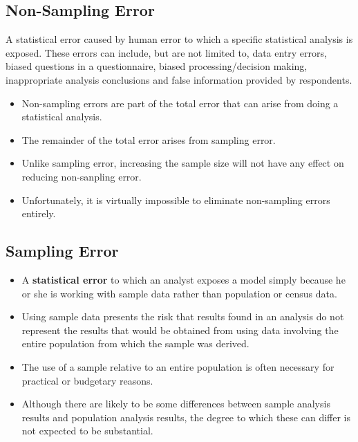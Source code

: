 ﻿\documentclass[]{report}
\begin{document}
\subsection{Non-Sampling Error}

A statistical error caused by human error to which a specific statistical analysis is exposed. These errors can include, but are not limited to, data entry errors, biased questions in a questionnaire, biased processing/decision making, inappropriate analysis conclusions and false information provided by respondents.




\begin{itemize}
\item 
Non-sampling errors are part of the total error that can arise from doing a statistical analysis. 
\item The remainder of the total error arises from sampling error. 
\item Unlike sampling error, increasing the sample size will not have any effect on reducing non-sanpling error.
\item Unfortunately, it is virtually impossible to eliminate non-sampling errors entirely. 
\end{itemize}



\subsection{Sampling Error}

\begin{itemize}
\item A \textbf{statistical error} to which an analyst exposes a model simply because he or she is working with sample data rather than population or census data.
\item Using sample data presents the risk that results found in an analysis do not represent the results that would be 
obtained from using data involving the entire population from which the sample was derived.
\end{itemize}


\begin{itemize}
\item The use of a sample relative to an entire population is often necessary for practical or budgetary reasons. 
\item Although there are likely to be some differences between sample analysis results and population analysis results, the degree to which these can 
differ is not expected to be substantial. 
\end{itemize}
\end{document}
